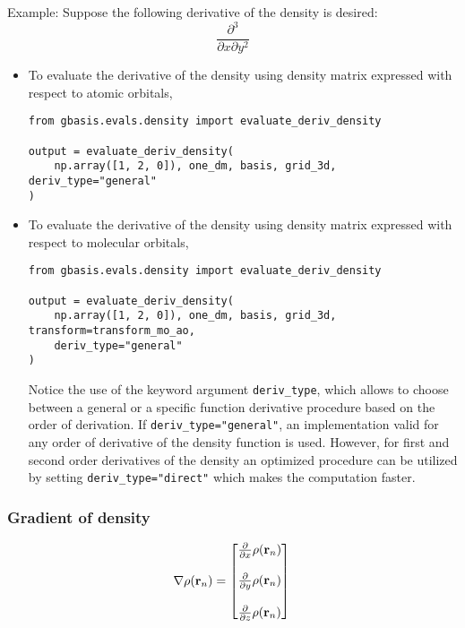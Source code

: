 \documentclass[letterpaper]{article}
\begin{document}
Example:
Suppose the following derivative of the density is desired:
\begin{equation}
  \frac{\partial^3}{\partial x \partial y^2}
\end{equation}
\begin{itemize}
\item To evaluate the derivative of the density using density matrix expressed
  with respect to atomic orbitals,
  \begin{lstlisting}[xleftmargin=-25pt]
from gbasis.evals.density import evaluate_deriv_density

output = evaluate_deriv_density(
	np.array([1, 2, 0]), one_dm, basis, grid_3d, deriv_type="general"
)
\end{lstlisting}
\item To evaluate the derivative of the density using density matrix expressed
  with respect to molecular orbitals,
\begin{lstlisting}
from gbasis.evals.density import evaluate_deriv_density

output = evaluate_deriv_density(
    np.array([1, 2, 0]), one_dm, basis, grid_3d, transform=transform_mo_ao,
    deriv_type="general"
)
\end{lstlisting}
Notice the use of the keyword argument \verb|deriv_type|, which allows to choose between a general or a specific function derivative procedure based on the order of derivation. If \verb|deriv_type="general"|, an implementation valid for any order of derivative of the density function is used. However, for first and second order derivatives of the density an optimized procedure can be utilized by setting \verb|deriv_type="direct"| which makes the computation faster.

\end{itemize}
\subsubsection{Gradient of density}
\begin{equation}
  \nabla \rho(\mathbf{r}_n)
  =
  \begin{bmatrix}
    \frac{\partial}{\partial x} \rho(\mathbf{r}_n)\\\\
    \frac{\partial}{\partial y} \rho(\mathbf{r}_n)\\\\
    \frac{\partial}{\partial z} \rho(\mathbf{r}_n)
  \end{bmatrix}\\
\end{equation}
\end{document}
